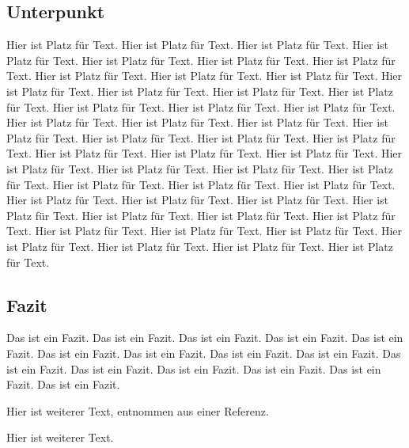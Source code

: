 \subsection{Unterpunkt}
Hier ist Platz für Text. Hier ist Platz für Text. Hier ist Platz für Text. Hier ist Platz für Text. Hier ist Platz für Text. Hier ist Platz für Text. Hier ist Platz für Text. Hier ist Platz für Text. Hier ist Platz für Text. Hier ist Platz für Text. Hier ist Platz für Text. Hier ist Platz für Text. Hier ist Platz für Text. Hier ist Platz für Text. Hier ist Platz für Text. Hier ist Platz für Text. Hier ist Platz für Text. Hier ist Platz für Text. Hier ist Platz für Text. Hier ist Platz für Text. Hier ist Platz für Text. Hier ist Platz für Text. Hier ist Platz für Text. Hier ist Platz für Text. Hier ist Platz für Text. Hier ist Platz für Text. Hier ist Platz für Text. Hier ist Platz für Text. Hier ist Platz für Text. Hier ist Platz für Text. Hier ist Platz für Text. Hier ist Platz für Text. Hier ist Platz für Text. Hier ist Platz für Text. Hier ist Platz für Text. Hier ist Platz für Text. Hier ist Platz für Text. Hier ist Platz für Text. Hier ist Platz für Text. Hier ist Platz für Text. Hier ist Platz für Text. Hier ist Platz für Text. Hier ist Platz für Text. Hier ist Platz für Text. Hier ist Platz für Text. Hier ist Platz für Text. Hier ist Platz für Text. Hier ist Platz für Text.

\subsection{Fazit}
Das ist ein Fazit. Das ist ein Fazit. Das ist ein Fazit. Das ist ein Fazit. Das ist ein Fazit. Das ist ein Fazit. Das ist ein Fazit. Das ist ein Fazit. Das ist ein Fazit. Das ist ein Fazit. Das ist ein Fazit. Das ist ein Fazit. Das ist ein Fazit. Das ist ein Fazit. Das ist ein Fazit.


Hier ist weiterer Text, entnommen aus einer Referenz. \cite{000:Reference}

Hier ist weiterer Text.
